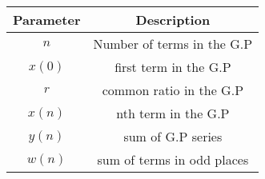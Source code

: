 
\begin{tabular}{|c|c|}
\hline
Parameter & Description \\
\hline
\( n \) & Number of terms in the G.P \\
\hline
\(x(0) \) & first term in the G.P \\
\hline
\( r \) & common ratio in the G.P \\
\hline
\( x(n) \) & nth term in the G.P \\
\hline
\( y(n) \) & sum of G.P series \\
\hline
\( w(n) \) & sum of terms in odd places\\
\hline
\end{tabular}



